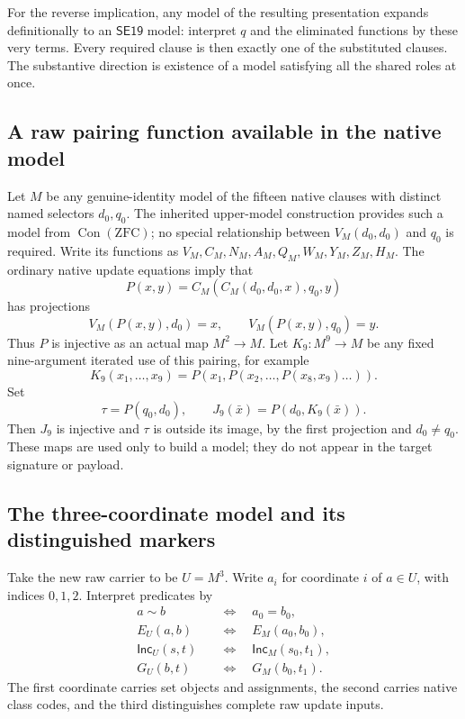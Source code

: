 For the reverse implication, any model of the resulting presentation
expands definitionally to an $\mathsf{SE19}$ model: interpret $q$ and
the eliminated functions by these very terms.  Every required clause is
then exactly one of the substituted clauses.  The substantive direction
is existence of a model satisfying all the shared roles at once.

\subsection{A raw pairing function available in the native model}

Let $M$ be any genuine-identity model of the fifteen native clauses with
distinct named selectors $d_0,q_0$.  The inherited upper-model
construction provides such a model from $\operatorname{Con}(\mathrm{ZFC})$;
no special relationship between $V_M(d_0,d_0)$ and $q_0$ is required.
Write its functions as $V_M,C_M,N_M,A_M,Q_M,W_M,Y_M,Z_M,H_M$.
The ordinary native update equations imply that
\[
 P(x,y)=C_M(C_M(d_0,d_0,x),q_0,y)
\]
has projections
\[
 V_M(P(x,y),d_0)=x,\qquad V_M(P(x,y),q_0)=y.
\]
Thus $P$ is injective as an actual map $M^2\to M$.
Let $K_9:M^9\to M$ be any fixed nine-argument iterated use of this
pairing, for example
\[
 K_9(x_1,\ldots,x_9)
 =P(x_1,P(x_2,\ldots,P(x_8,x_9)\ldots)).
\]
Set
\[
 \tau=P(q_0,d_0),\qquad
 J_9(\bar x)=P(d_0,K_9(\bar x)).
\]
Then $J_9$ is injective and $\tau$ is outside its image, by the first
projection and $d_0\ne q_0$.  These maps are used only to build a model;
they do not appear in the target signature or payload.

\subsection{The three-coordinate model and its distinguished markers}

Take the new raw carrier to be $U=M^3$.  Write $a_i$ for coordinate $i$
of $a\in U$, with indices $0,1,2$.  Interpret predicates by
\begin{align*}
 a\sim b&\quad\Longleftrightarrow\quad a_0=b_0,\\
 E_U(a,b)&\quad\Longleftrightarrow\quad E_M(a_0,b_0),\\
 \mathsf{Inc}_U(s,t)&\quad\Longleftrightarrow\quad
       \mathsf{Inc}_M(s_0,t_1),\\
 G_U(b,t)&\quad\Longleftrightarrow\quad G_M(b_0,t_1).
\end{align*}
The first coordinate carries set objects and assignments, the second
carries native class codes, and the third distinguishes complete raw
update inputs.

